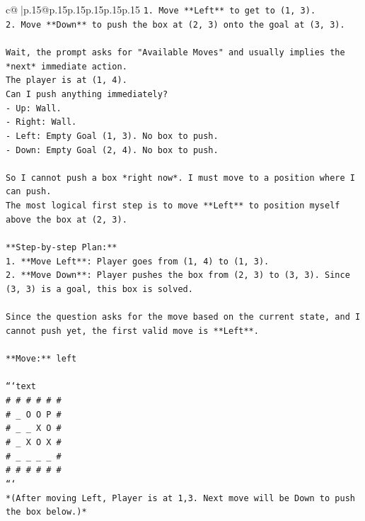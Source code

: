 \documentclass{article}
\begin{document}
{\begin{supertabular}{c@{$\;$}|p{.15\linewidth}@{}p{.15\linewidth}p{.15\linewidth}p{.15\linewidth}p{.15\linewidth}p{.15\linewidth}}
{{{\texttt{1.  Move **Left** to get to (1, 3).} \\
\texttt{2.  Move **Down** to push the box at (2, 3) onto the goal at (3, 3).} \\
\\ 
\texttt{Wait, the prompt asks for "Available Moves" and usually implies the *next* immediate action.} \\
\texttt{The player is at (1, 4).} \\
\texttt{Can I push anything immediately?} \\
\texttt{{-} Up: Wall.} \\
\texttt{{-} Right: Wall.} \\
\texttt{{-} Left: Empty Goal (1, 3). No box to push.} \\
\texttt{{-} Down: Empty Goal (2, 4). No box to push.} \\
\\ 
\texttt{So I cannot push a box *right now*. I must move to a position where I can push.} \\
\texttt{The most logical first step is to move **Left** to position myself above the box at (2, 3).} \\
\\ 
\texttt{**Step{-}by{-}step Plan:**} \\
\texttt{1.  **Move Left**: Player goes from (1, 4) to (1, 3).} \\
\texttt{2.  **Move Down**: Player pushes the box from (2, 3) to (3, 3). Since (3, 3) is a goal, this box is solved.} \\
\\ 
\texttt{Since the question asks for the move based on the current state, and I cannot push yet, the first valid move is **Left**.} \\
\\ 
\texttt{**Move:** left} \\
\\ 
\texttt{```text} \\
\texttt{\# \# \# \# \# \#} \\
\texttt{\# \_ O O P \#} \\
\texttt{\# \_ \_ X O \#} \\
\texttt{\# \_ X O X \#} \\
\texttt{\# \_ \_ \_ \_ \#} \\
\texttt{\# \# \# \# \# \#} \\
\texttt{```} \\
\texttt{*(After moving Left, Player is at 1,3. Next move will be Down to push the box below.)*} \\
}}}
\end{supertabular}}
\end{document}
